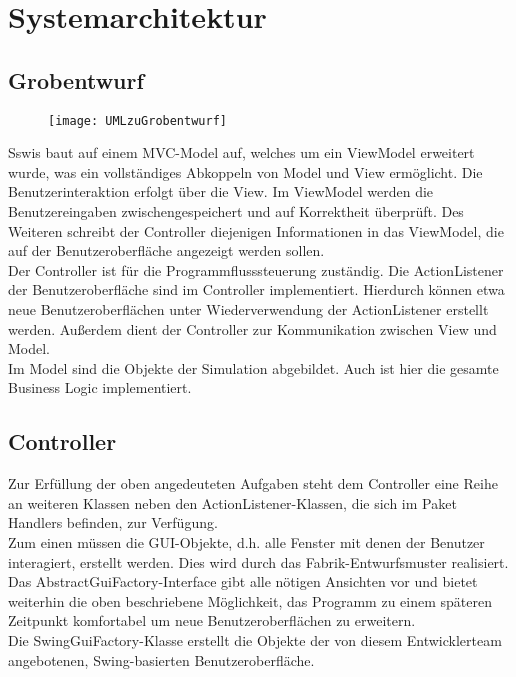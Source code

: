 \section{Systemarchitektur}

\subsection{Grobentwurf}

\begin{figure} 
  \centering
     \texttt{[image: UMLzuGrobentwurf]}
\end{figure}

Sswis baut auf einem MVC-Model auf, welches um ein ViewModel erweitert wurde, was ein vollständiges Abkoppeln von Model und View ermöglicht.
Die Benutzerinteraktion erfolgt über die View. Im ViewModel werden die Benutzereingaben zwischengespeichert und auf Korrektheit überprüft. Des Weiteren schreibt der Controller diejenigen Informationen in das ViewModel, die auf der Benutzeroberfläche angezeigt werden sollen.\\
Der Controller ist für die Programmflusssteuerung zuständig. Die ActionListener der Benutzeroberfläche sind im Controller implementiert. Hierdurch können etwa neue Benutzeroberflächen unter Wiederverwendung der ActionListener erstellt werden.
Außerdem dient der Controller zur Kommunikation zwischen View und Model.\\
Im Model sind die Objekte der Simulation abgebildet. Auch ist hier die gesamte Business Logic implementiert.

\subsection{Controller}

\noindent
{}

Zur Erfüllung der oben angedeuteten Aufgaben steht dem Controller eine Reihe an weiteren Klassen neben den ActionListener-Klassen, die sich im Paket Handlers befinden, zur Verfügung.\\
Zum einen müssen die GUI-Objekte, d.h. alle Fenster mit denen der Benutzer interagiert, erstellt werden. Dies wird durch das Fabrik-Entwurfsmuster realisiert. Das AbstractGuiFactory-Interface gibt alle nötigen Ansichten vor und bietet weiterhin die oben beschriebene Möglichkeit, das Programm zu einem späteren Zeitpunkt komfortabel um neue Benutzeroberflächen zu erweitern.\\
Die SwingGuiFactory-Klasse erstellt die Objekte der von diesem Entwicklerteam angebotenen, Swing-basierten Benutzeroberfläche.

